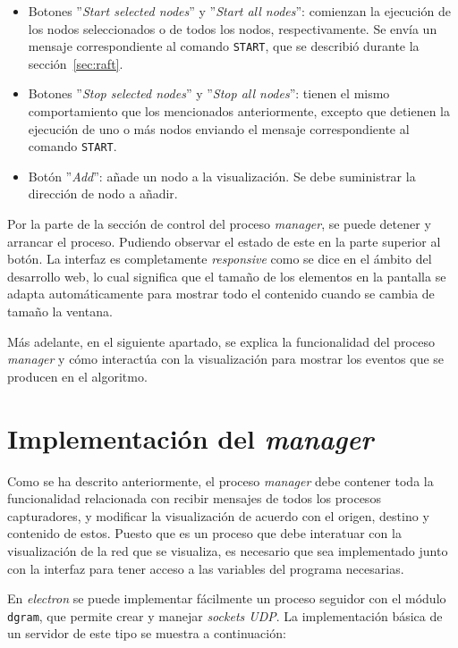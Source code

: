 \begin{itemize}
\item Botones ''\textit{Start selected nodes}'' y ''\textit{Start all nodes}'': comienzan la ejecución de los nodos seleccionados o de todos los nodos, respectivamente. Se envía un mensaje correspondiente al comando \texttt{START}, que se describió durante la sección~\ref{sec:raft}.

\item Botones ''\textit{Stop selected nodes}'' y ''\textit{Stop all nodes}'': tienen el mismo comportamiento que los mencionados anteriormente, excepto que detienen la ejecución de uno o más nodos enviando el mensaje correspondiente al comando \texttt{START}.

\item Botón ''\textit{Add}'': añade un nodo a la visualización. Se debe suministrar la dirección de nodo a añadir.
\end{itemize}

Por la parte de la sección de control del proceso \textit{manager}, se puede detener y arrancar el proceso. Pudiendo observar el estado de este en la parte superior al botón. La interfaz es completamente \textit{responsive} como se dice en el ámbito del desarrollo web, lo cual significa que el tamaño de los elementos en la pantalla se adapta automáticamente para mostrar todo el contenido cuando se cambia de tamaño la ventana.

Más adelante, en el siguiente apartado, se explica la funcionalidad del proceso \textit{manager} y cómo interactúa con la visualización para mostrar los eventos que se producen en el algoritmo. 

\section{Implementación del \textit{manager}}

Como se ha descrito anteriormente, el proceso \textit{manager} debe contener toda la funcionalidad relacionada con recibir mensajes de todos los procesos capturadores, y modificar la visualización de acuerdo con el origen, destino y contenido de estos. Puesto que es un proceso que debe interatuar con la visualización de la red que se visualiza, es necesario que sea implementado junto con la interfaz para tener acceso a las variables del programa necesarias.

En \textit{electron} se puede implementar fácilmente un proceso seguidor con el módulo \texttt{dgram}, que permite crear y manejar \textit{sockets UDP}. La implementación básica de un servidor de este tipo se muestra a continuación:


